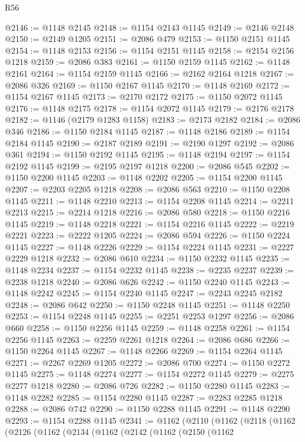 \begin{lexlean}{R56}
\begin{coremodule}
@2146 := @1148 @2145
@2148 := @1154 @2143 @1145
@2149 := @2146 @2148
@2150 := @2149 @1205
@2151 := @2086 @479
@2153 := @1150 @2151 @1145
@2154 := @1148 @2153
@2156 := @1154 @2151 @1145
@2158 := @2154 @2156 @1218
@2159 := @2086 @383
@2161 := @1150 @2159 @1145
@2162 := @1148 @2161
@2164 := @1154 @2159 @1145
@2166 := @2162 @2164 @1218
@2167 := @2086 @326
@2169 := @1150 @2167 @1145
@2170 := @1148 @2169
@2172 := @1154 @2167 @1145
@2173 := @2170 @2172
@2175 := @1150 @2072 @1145
@2176 := @1148 @2175
@2178 := @1154 @2072 @1145
@2179 := @2176 @2178
@2182 := @1146 (@2179 @1283 @1158)
@2183 := @2173 @2182
@2184 := @2086 @346
@2186 := @1150 @2184 @1145
@2187 := @1148 @2186
@2189 := @1154 @2184 @1145
@2190 := @2187 @2189
@2191 := @2190 @1297
@2192 := @2086 @361
@2194 := @1150 @2192 @1145
@2195 := @1148 @2194
@2197 := @1154 @2192 @1145
@2199 := @2195 @2197 @1218
@2200 := @2086 @545
@2202 := @1150 @2200 @1145
@2203 := @1148 @2202
@2205 := @1154 @2200 @1145
@2207 := @2203 @2205 @1218
@2208 := @2086 @563
@2210 := @1150 @2208 @1145
@2211 := @1148 @2210
@2213 := @1154 @2208 @1145
@2214 := @2211 @2213
@2215 := @2214 @1218
@2216 := @2086 @580
@2218 := @1150 @2216 @1145
@2219 := @1148 @2218
@2221 := @1154 @2216 @1145
@2222 := @2219 @2221
@2223 := @2222 @1205
@2224 := @2086 @594
@2226 := @1150 @2224 @1145
@2227 := @1148 @2226
@2229 := @1154 @2224 @1145
@2231 := @2227 @2229 @1218
@2232 := @2086 @610
@2234 := @1150 @2232 @1145
@2235 := @1148 @2234
@2237 := @1154 @2232 @1145
@2238 := @2235 @2237
@2239 := @2238 @1218
@2240 := @2086 @626
@2242 := @1150 @2240 @1145
@2243 := @1148 @2242
@2245 := @1154 @2240 @1145
@2247 := @2243 @2245 @2182
@2248 := @2086 @642
@2250 := @1150 @2248 @1145
@2251 := @1148 @2250
@2253 := @1154 @2248 @1145
@2255 := @2251 @2253 @1297
@2256 := @2086 @660
@2258 := @1150 @2256 @1145
@2259 := @1148 @2258
@2261 := @1154 @2256 @1145
@2263 := @2259 @2261 @1218
@2264 := @2086 @686
@2266 := @1150 @2264 @1145
@2267 := @1148 @2266
@2269 := @1154 @2264 @1145
@2271 := @2267 @2269 @1205
@2272 := @2086 @700
@2274 := @1150 @2272 @1145
@2275 := @1148 @2274
@2277 := @1154 @2272 @1145
@2279 := @2275 @2277 @1218
@2280 := @2086 @726
@2282 := @1150 @2280 @1145
@2283 := @1148 @2282
@2285 := @1154 @2280 @1145
@2287 := @2283 @2285 @1218
@2288 := @2086 @742
@2290 := @1150 @2288 @1145
@2291 := @1148 @2290
@2293 := @1154 @2288 @1145
@2341 := @1162
    (@2110
      (@1162
        (@2118
          (@1162
            (@2126
              (@1162
                (@2134
                  (@1162
                    (@2142
                      (@1162
                        (@2150
                          (@1162

\end{coremodule}
\end{lexlean}
